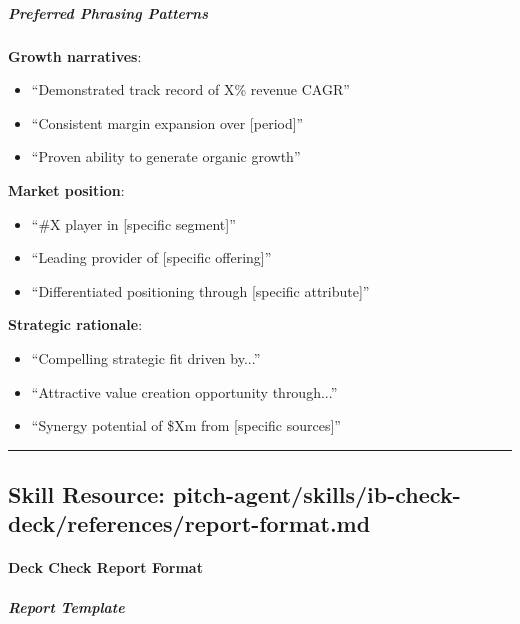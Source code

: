 \documentclass[11pt]{article}
\begin{document}
\subparagraph{Preferred Phrasing Patterns}\mbox{}\par

\textbf{Growth narratives}:

\begin{itemize}[leftmargin=*,itemsep=2pt,topsep=2pt]
\item {} ``Demonstrated track record of X\% revenue CAGR''
\item {} ``Consistent margin expansion over [period]''
\item {} ``Proven ability to generate organic growth''
\end{itemize}

\textbf{Market position}:

\begin{itemize}[leftmargin=*,itemsep=2pt,topsep=2pt]
\item {} ``\#X player in [specific segment]''
\item {} ``Leading provider of [specific offering]''
\item {} ``Differentiated positioning through [specific attribute]''
\end{itemize}

\textbf{Strategic rationale}:

\begin{itemize}[leftmargin=*,itemsep=2pt,topsep=2pt]
\item {} ``Compelling strategic fit driven by...''
\item {} ``Attractive value creation opportunity through...''
\item {} ``Synergy potential of \$Xm from [specific sources]''
\end{itemize}

\vspace{0.8em}\hrule\vspace{0.8em}

\subsection{Skill Resource: pitch-agent/skills/ib-check-deck/references/report-format.md}\label{file:pitch-agent-skills-ib-check-deck-references-report-format-md}

\paragraph{Deck Check Report Format}\mbox{}\par

\subparagraph{Report Template}\mbox{}\par
\end{document}
